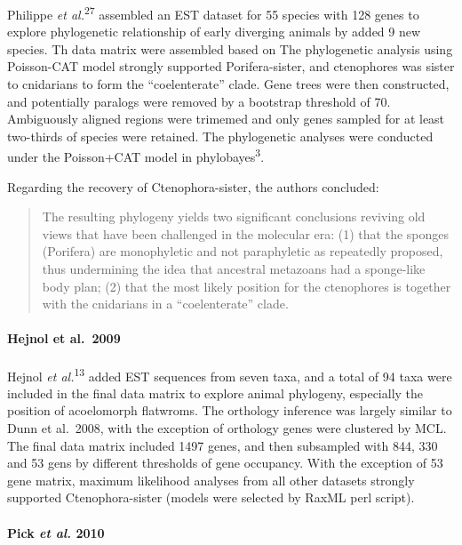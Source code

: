 \documentclass[]{article}
\let\oldparagraph\paragraph
\renewcommand{\paragraph}[1]{\oldparagraph{#1}\mbox{}}
\begin{document}
Philippe \emph{et al.}\textsuperscript{27} assembled an EST dataset for
55 species with 128 genes to explore phylogenetic relationship of early
diverging animals by added 9 new species. Th data matrix were assembled
based on The phylogenetic analysis using Poisson-CAT model strongly
supported Porifera-sister, and ctenophores was sister to cnidarians to
form the ``coelenterate'' clade. Gene trees were then constructed, and
potentially paralogs were removed by a bootstrap threshold of 70.
Ambiguously aligned regions were trimemed and only genes sampled for at
least two-thirds of species were retained. The phylogenetic analyses
were conducted under the Poisson+CAT model in
phylobayes\textsuperscript{3}.

Regarding the recovery of Ctenophora-sister, the authors concluded:

\begin{quote}
The resulting phylogeny yields two significant conclusions reviving old
views that have been challenged in the molecular era: (1) that the
sponges (Porifera) are monophyletic and not paraphyletic as repeatedly
proposed, thus undermining the idea that ancestral metazoans had a
sponge-like body plan; (2) that the most likely position for the
ctenophores is together with the cnidarians in a ``coelenterate'' clade.
\end{quote}

\hypertarget{hejnol-et-al.2009}{%
\paragraph{Hejnol et al.~2009}\label{hejnol-et-al.2009}}

Hejnol \emph{et al.}\textsuperscript{13} added EST sequences from seven
taxa, and a total of 94 taxa were included in the final data matrix to
explore animal phylogeny, especially the position of acoelomorph
flatwroms. The orthology inference was largely similar to Dunn et
al.~2008, with the exception of orthology genes were clustered by MCL.
The final data matrix included 1497 genes, and then subsampled with 844,
330 and 53 gens by different thresholds of gene occupancy. With the
exception of 53 gene matrix, maximum likelihood analyses from all other
datasets strongly supported Ctenophora-sister (models were selected by
RaxML perl script).

\hypertarget{pick-et-al.-2010}{%
\paragraph{\texorpdfstring{Pick \emph{et al.}
2010}{Pick et al. 2010}}\label{pick-et-al.-2010}}
\end{document}
